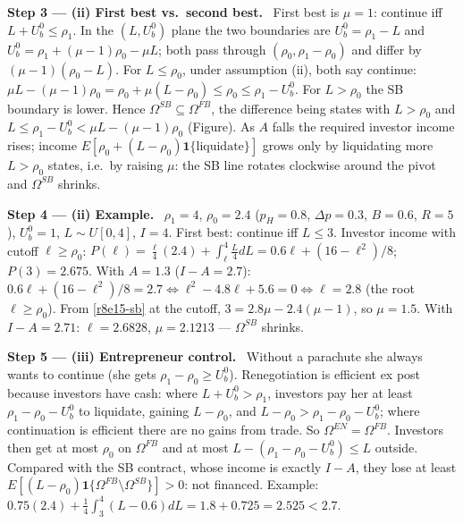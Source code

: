 \documentclass[11pt,a4paper]{article}
\newcommand{\step}[2]{\par\medskip\noindent\textbf{Step #1 --- #2.}~}
\newcommand{\dpp}{\Delta p}
\begin{document}
\step{3}{(ii) First best vs.\ second best} First best is $\mu=1$: continue iff $L+U_b^0\le\rho_1$. In the $(L,U_b^0)$ plane the two boundaries are $U_b^0=\rho_1-L$ and $U_b^0=\rho_1+(\mu-1)\rho_0-\mu L$; both pass through $(\rho_0,\rho_1-\rho_0)$ and differ by $(\mu-1)(\rho_0-L)$. For $L\le\rho_0$, under assumption (ii), both say continue: $\mu L-(\mu-1)\rho_0=\rho_0+\mu(L-\rho_0)\le\rho_0\le\rho_1-U_b^0$. For $L>\rho_0$ the SB boundary is lower. Hence $\Omega^{SB}\subseteq\Omega^{FB}$, the difference being states with $L>\rho_0$ and $L\le\rho_1-U_b^0<\mu L-(\mu-1)\rho_0$ (Figure). As $A$ falls the required investor income rises; income $E[\rho_0+(L-\rho_0)\mathbf 1\{\text{liquidate}\}]$ grows only by liquidating more $L>\rho_0$ states, i.e.\ by raising $\mu$: the SB line rotates clockwise around the pivot and $\Omega^{SB}$ shrinks.

\begin{center}
\end{center}

\step{4}{(ii) Example} $\rho_1=4$, $\rho_0=2.4$ ($p_H=0.8$, $\dpp=0.3$, $B=0.6$, $R=5$), $U_b^0=1$, $L\sim U[0,4]$, $I=4$. First best: continue iff $L\le3$. Investor income with cutoff $\ell\ge\rho_0$: $P(\ell)=\tfrac{\ell}{4}(2.4)+\int_\ell^4\tfrac{L}{4}dL=0.6\ell+(16-\ell^2)/8$; $P(3)=2.675$. With $A=1.3$ ($I-A=2.7$): $0.6\ell+(16-\ell^2)/8=2.7\iff\ell^2-4.8\ell+5.6=0\iff\ell=2.8$ (the root $\ell\ge\rho_0$). From \eqref{r8e15-sb} at the cutoff, $3=2.8\mu-2.4(\mu-1)$, so $\mu=1.5$. With $I-A=2.71$: $\ell=2.6828$, $\mu=2.1213$ --- $\Omega^{SB}$ shrinks.

\step{5}{(iii) Entrepreneur control} Without a parachute she always wants to continue (she gets $\rho_1-\rho_0\ge U_b^0$). Renegotiation is efficient ex post because investors have cash: where $L+U_b^0>\rho_1$, investors pay her at least $\rho_1-\rho_0-U_b^0$ to liquidate, gaining $L-\rho_0$, and $L-\rho_0>\rho_1-\rho_0-U_b^0$; where continuation is efficient there are no gains from trade. So $\Omega^{EN}=\Omega^{FB}$. Investors then get at most $\rho_0$ on $\Omega^{FB}$ and at most $L-(\rho_1-\rho_0-U_b^0)\le L$ outside. Compared with the SB contract, whose income is exactly $I-A$, they lose at least $E[(L-\rho_0)\mathbf 1\{\Omega^{FB}\setminus\Omega^{SB}\}]>0$: not financed. Example: $0.75(2.4)+\tfrac14\int_3^4(L-0.6)dL=1.8+0.725=2.525<2.7$.
\end{document}
